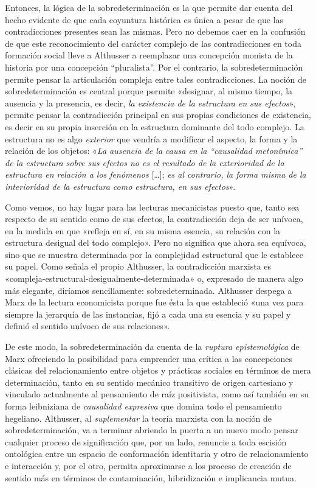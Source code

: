 Entonces, la lógica de la sobredeterminación es la que permite dar cuenta del hecho evidente de que cada coyuntura histórica es única a pesar de que las contradicciones presentes sean las mismas. Pero no debemos caer en la confusión de que este reconocimiento del carácter complejo de las contradicciones en toda formación social lleve a Althusser a reemplazar una concepción monista de la historia por una concepción ``pluralista''. Por el contrario, la sobredeterminación permite pensar la articulación compleja entre tales contradicciones. La noción de sobredeterminación es central porque permite «designar, al mismo tiempo, la ausencia y la presencia, es decir, \emph{la existencia de la estructura en sus efectos}», permite pensar la contradicción principal en sus propias condiciones de existencia, es decir en su propia inserción en la estructura dominante del todo complejo. La estructura no es algo \emph{exterior} que vendría a modificar el aspecto, la forma y la relación de los objetos: «\emph{La ausencia de la causa en la ``causalidad metonímica'' de la estructura sobre sus efectos no es el resultado de la exterioridad de la estructura en relación a los fenómenos} {[}\ldots{]}; \emph{es al contrario, la forma misma de la interioridad de la estructura como estructura, en sus efectos}».

Como vemos, no hay lugar para las lecturas mecanicistas puesto que, tanto sea respecto de su sentido como de sus efectos, la contradicción deja de ser unívoca, en la medida en que «refleja en sí, en su misma esencia, su relación con la estructura desigual del todo complejo». Pero no significa que ahora sea equívoca, sino que se muestra determinada por la complejidad estructural que le establece su papel. Como señala el propio Althusser, la contradicción marxista es «compleja-estructural-desigualmente-determinada» o, expresado de manera algo más elegante, diríamos sencillamente: sobredeterminada. Althusser despega a Marx de la lectura economicista porque fue ésta la que estableció «una vez para siempre la jerarquía de las instancias, fijó a cada una su esencia y su papel y definió el sentido unívoco de sus relaciones».

De este modo, la sobredeterminación da cuenta de la \emph{ruptura epistemológica} de Marx ofreciendo la posibilidad para emprender una crítica a las concepciones clásicas del relacionamiento entre objetos y prácticas sociales en términos de mera determinación, tanto en su sentido mecánico transitivo de origen cartesiano y vinculado actualmente al pensamiento de raíz positivista, como así también en su forma leibniziana de \emph{causalidad expresiva} que domina todo el pensamiento hegeliano. Althusser, al \emph{suplementar} la teoría marxista con la noción de sobredeterminación, va a terminar abriendo la puerta a un nuevo modo pensar cualquier proceso de significación que, por un lado, renuncie a toda escisión ontológica entre un espacio de conformación identitaria y otro de relacionamiento e interacción y, por el otro, permita aproximarse a los proceso de creación de sentido más en términos de contaminación, hibridización e implicancia mutua.

